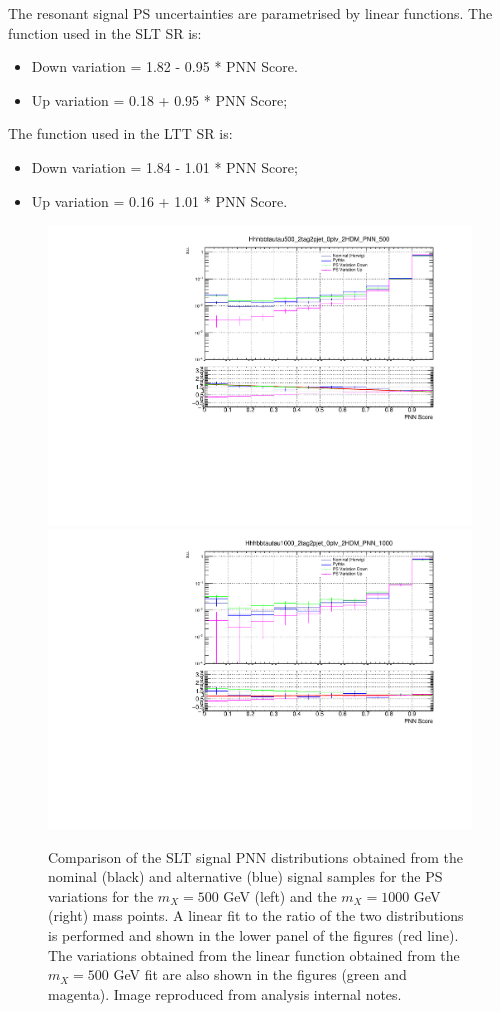 The resonant signal PS uncertainties are parametrised by linear functions. 
The function used in the SLT SR is:
\begin{itemize}
\item Down variation = 1.82 - 0.95 * PNN Score.
\item Up variation = 0.18 + 0.95 * PNN Score;
\end{itemize}
The function used in the LTT SR is:
\begin{itemize}
\item Down variation = 1.84 - 1.01 * PNN Score;
\item Up variation = 0.16 + 1.01 * PNN Score.
\end{itemize}
\begin{figure}
\centering
\includegraphics[width=.49\textwidth]{figures/systs/LepHad_Signal_SLT_500_psSysts_PNN_Fit_Logy.pdf}
\includegraphics[width=.49\textwidth]{figures/systs/LepHad_Signal_SLT_1000_psSysts_PNN_Fit_Logy.pdf}
\caption{Comparison of the SLT signal PNN distributions obtained from 
the nominal (black) and alternative (blue) signal samples for the PS variations for 
the  $m_X= 500$ GeV (left) and the $m_X=1000$ GeV (right) mass points. 
A linear fit to the ratio of the two distributions is performed 
and shown in the lower panel of the figures (red line). 
The variations obtained from the linear function obtained from the $m_X= 500$ 
GeV fit are also shown in the figures (green and magenta).
Image reproduced from analysis internal notes.}
\label{fig:LepHadSLTSignalSysts}
\end{figure}

